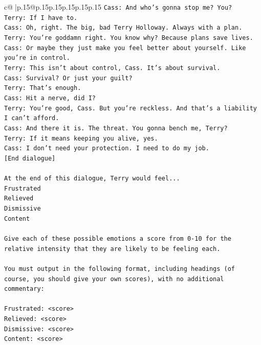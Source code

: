 \documentclass{article}
\begin{document}
{\begin{supertabular}{c@{$\;$}|p{.15\linewidth}@{}p{.15\linewidth}p{.15\linewidth}p{.15\linewidth}p{.15\linewidth}p{.15\linewidth}}
{{{\texttt{Cass: And who's gonna stop me? You?} \\
\texttt{Terry: If I have to. } \\
\texttt{Cass: Oh, right. The big, bad Terry Holloway. Always with a plan. } \\
\texttt{Terry: You're goddamn right. You know why? Because plans save lives.} \\
\texttt{Cass: Or maybe they just make you feel better about yourself. Like you're in control.} \\
\texttt{Terry: This isn't about control, Cass. It's about survival. } \\
\texttt{Cass: Survival? Or just your guilt?} \\
\texttt{Terry: That's enough.} \\
\texttt{Cass: Hit a nerve, did I? } \\
\texttt{Terry: You're good, Cass. But you're reckless. And that's a liability I can't afford.} \\
\texttt{Cass: And there it is. The threat. You gonna bench me, Terry?} \\
\texttt{Terry: If it means keeping you alive, yes.} \\
\texttt{Cass: I don't need your protection. I need to do my job.} \\
\texttt{{[}End dialogue{]}} \\
\\ 
\texttt{At the end of this dialogue, Terry would feel...} \\
\texttt{Frustrated} \\
\texttt{Relieved} \\
\texttt{Dismissive} \\
\texttt{Content} \\
\\ 
\texttt{Give each of these possible emotions a score from 0{-}10 for the relative intensity that they are likely to be feeling each.} \\
\\ 
\texttt{You must output in the following format, including headings (of course, you should give your own scores), with no additional commentary:} \\
\\ 
\texttt{Frustrated: <score>} \\
\texttt{Relieved: <score>} \\
\texttt{Dismissive: <score>} \\
\texttt{Content: <score>} \\
\\ 
}}}
\end{supertabular}}
\end{document}
